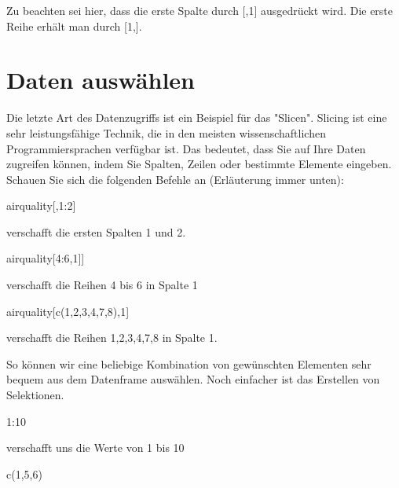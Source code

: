 \documentclass[a4paper,twoside]{tufte-book}\usepackage[]{graphicx}\usepackage[]{color}
\begin{document}
\begin{Anhang}
Zu beachten sei hier, dass die erste Spalte durch [,1] ausgedrückt wird. Die erste Reihe erhält man durch [1,].

\section{Daten auswählen}

Die letzte Art des Datenzugriffs ist ein Beispiel für das "Slicen". Slicing ist eine sehr leistungsfähige Technik, die in den meisten wissenschaftlichen Programmiersprachen verfügbar ist. Das bedeutet, dass Sie auf Ihre Daten zugreifen können, indem Sie Spalten, Zeilen oder bestimmte Elemente eingeben. Schauen Sie sich die folgenden Befehle an (Erläuterung immer unten):

\begin{Schunk}
\begin{Sinput}
airquality[,1:2]
\end{Sinput}
\end{Schunk}

verschafft die ersten Spalten 1 und 2.


\begin{Schunk}
\begin{Sinput}
airquality[4:6,1]]
\end{Sinput}
\end{Schunk}

verschafft die Reihen 4 bis 6 in Spalte 1


\begin{Schunk}
\begin{Sinput}
airquality[c(1,2,3,4,7,8),1]
\end{Sinput}
\end{Schunk}

verschafft die Reihen 1,2,3,4,7,8 in Spalte 1. 

So können wir eine beliebige Kombination von gewünschten Elementen sehr bequem aus dem Datenframe auswählen. Noch einfacher ist das Erstellen von Selektionen.


\begin{Schunk}
\begin{Sinput}
1:10
\end{Sinput}
\end{Schunk}

verschafft uns die Werte von 1 bis 10

\begin{Schunk}
\begin{Sinput}
c(1,5,6)
\end{Sinput}
\end{Schunk}


\end{Anhang}
\end{document}
